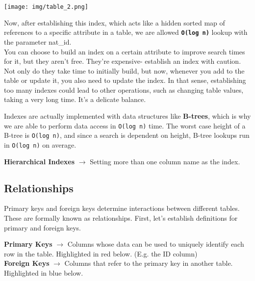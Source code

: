 \documentclass[english, 10pt]{article}
\begin{document}
{
\centering
\texttt{[image: img/table\_2.png]} 
}


\hfill \break Now, after establishing this index, which acts like a hidden sorted map of references to a specific attribute in a table, we are allowed \texttt{\textbf{O(log n)}} lookup with the parameter nat\_id.\\

You can choose to build an index on a certain attribute to improve search times for it, but they aren't free. They're expensive- establish an index with caution. Not only do they take time to initially build, but now, whenever you add to the table or update it, you also need to update the index. In that sense, establishing too many indexes could lead to other operations, such as changing table values, taking a very long time. It's a delicate balance.\\


\begin{tcolorbox}[title=Aside: Indexes,colframe=black,colback=white,arc=0pt,fonttitle=\bfseries]
Indexes are actually implemented with data structures like \textbf{B-trees}, which is why we are able to perform data access in \texttt{O(log n)} time. The worst case height of a B-tree is \texttt{O(log n)}, and since a search is dependent on height, B-tree lookups run in \texttt{O(log n)} on average.
\end{tcolorbox}
\begin{tcolorbox}[title=Definition:,colframe=red!75!black,colback=red!5!white,arc=0pt,fonttitle=\bfseries]
	\textbf{Hierarchical Indexes} $\rightarrow$ Setting more than one column name as the index. 
	\end{tcolorbox}


\subsection{Relationships}

Primary keys and foreign keys determine interactions between different tables. These are formally known as relationships. First, let's establish definitions for primary and foreign keys.\\

\begin{tcolorbox}[title=Definition:,colframe=red!75!black,colback=red!5!white,arc=0pt,fonttitle=\bfseries]
\textbf{Primary Keys} $\rightarrow$ Columns whose data can be used to uniquely identify each row in the table. Highlighted in red below. (E.g. the ID column)\\
\textbf{Foreign Keys} $\rightarrow$ Columns that refer to the primary key in another table. Highlighted in blue below.
\end{tcolorbox}
\end{document}
